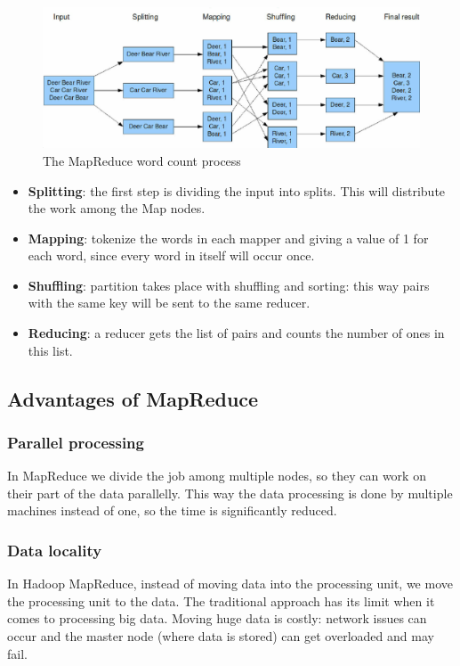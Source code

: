 \begin{figure}[H]
	\includegraphics[width=150mm, keepaspectratio]{figures/MapReduce_Example.png}
	\caption{The MapReduce word count process \cite{MapReduce-example-figure}}
	\centering
\end{figure}
\begin{itemize}
	\item \textbf{Splitting}: the first step is dividing the input into splits. This will distribute the work among the Map nodes.
	\item \textbf{Mapping}: tokenize the words in each mapper and giving a value of 1 for each word, since every word in itself will occur once.
	\item \textbf{Shuffling}: partition takes place with shuffling and sorting: this way pairs with the same key will be sent to the same reducer.
	\item \textbf{Reducing}: a reducer gets the list of pairs and counts the number of ones in this list.
\end{itemize}

\subsection{Advantages of MapReduce \cite{MapReduce-example}}
\subsubsection{Parallel processing}
In MapReduce we divide the job among multiple nodes, so they can work on their part of the data parallelly. This way the data processing is done by multiple machines instead of one, so the time is significantly reduced.
\subsubsection{Data locality}
In Hadoop MapReduce, instead of moving data into the processing unit, we move the processing unit to the data. The traditional approach has its limit when it comes to processing big data. Moving huge data is costly: network issues can occur and the master node (where data is stored) can get overloaded and may fail. 

